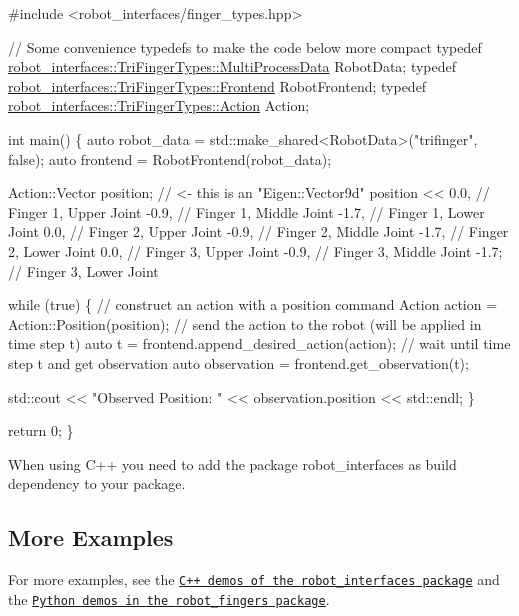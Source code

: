 \begin{DoxyCode}
\textcolor{preprocessor}{#include <robot\_interfaces/finger\_types.hpp>}

\textcolor{comment}{// Some convenience typedefs to make the code below more compact}
\textcolor{keyword}{typedef} \hyperlink{classrobot__interfaces_1_1MultiProcessRobotData}{robot\_interfaces::TriFingerTypes::MultiProcessData}
       RobotData;
\textcolor{keyword}{typedef} \hyperlink{classrobot__interfaces_1_1RobotFrontend}{robot\_interfaces::TriFingerTypes::Frontend} RobotFrontend;
\textcolor{keyword}{typedef} \hyperlink{structrobot__interfaces_1_1NJointAction}{robot\_interfaces::TriFingerTypes::Action} Action;

\textcolor{keywordtype}{int} main()
\{
    \textcolor{keyword}{auto} robot\_data = std::make\_shared<RobotData>(\textcolor{stringliteral}{"trifinger"}, \textcolor{keyword}{false});
    \textcolor{keyword}{auto} frontend = RobotFrontend(robot\_data);

    Action::Vector position;  \textcolor{comment}{// <- this is an "Eigen::Vector9d"}
    position <<  0.0,  \textcolor{comment}{// Finger 1, Upper Joint}
                -0.9,  \textcolor{comment}{// Finger 1, Middle Joint}
                -1.7,  \textcolor{comment}{// Finger 1, Lower Joint}
                 0.0,  \textcolor{comment}{// Finger 2, Upper Joint}
                -0.9,  \textcolor{comment}{// Finger 2, Middle Joint}
                -1.7,  \textcolor{comment}{// Finger 2, Lower Joint}
                 0.0,  \textcolor{comment}{// Finger 3, Upper Joint}
                -0.9,  \textcolor{comment}{// Finger 3, Middle Joint}
                -1.7;  \textcolor{comment}{// Finger 3, Lower Joint}

    \textcolor{keywordflow}{while} (\textcolor{keyword}{true})
    \{
        \textcolor{comment}{// construct an action with a position command}
        Action action = Action::Position(position);
        \textcolor{comment}{// send the action to the robot (will be applied in time step t)}
        \textcolor{keyword}{auto} t = frontend.append\_desired\_action(action);
        \textcolor{comment}{// wait until time step t and get observation}
        \textcolor{keyword}{auto} observation = frontend.get\_observation(t);

        std::cout << \textcolor{stringliteral}{"Observed Position: "}
                  << observation.position
                  << std::endl;
    \}

    \textcolor{keywordflow}{return} 0;
\}
\end{DoxyCode}


When using C++ you need to add the package {\ttfamily robot\+\_\+interfaces} as build dependency to your package.

\subsection*{More Examples}

For more examples, see the \href{https://github.com/open-dynamic-robot-initiative/robot_interfaces/tree/master/demos}{\tt C++ demos of the {\ttfamily robot\+\_\+interfaces} package} and the \href{https://github.com/open-dynamic-robot-initiative/robot_fingers/tree/master/demos}{\tt Python demos in the {\ttfamily robot\+\_\+fingers} package}. 
